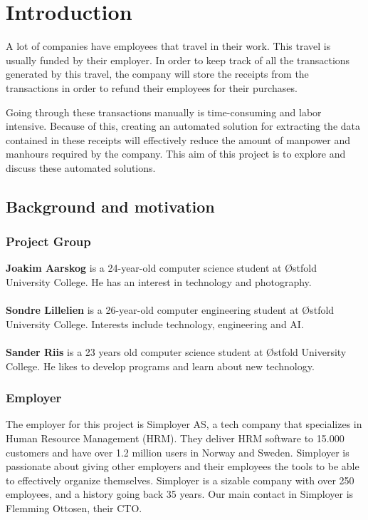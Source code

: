 \chapter{Introduction}
\label{ch:intro}
A lot of companies have employees that travel in their work.
This travel is usually funded by their employer.
In order to keep track of all the transactions generated by this travel, the company will store the receipts from the transactions in order to refund their employees for their purchases.

Going through these transactions manually is time-consuming and labor intensive.
Because of this, creating an automated solution for extracting the data contained in these receipts will effectively reduce the amount of manpower and manhours required by the company.
This aim of this project is to explore and discuss these automated solutions.

\section{Background and motivation}\label{sec:background-and-motivation}
\subsection{Project Group}\label{subsec:project-group}
\textbf{Joakim Aarskog} is a 24-year-old computer science student at Østfold University College.
He has an interest in technology and photography.\\
\\
\textbf{Sondre Lillelien} is a 26-year-old computer engineering student at Østfold University College.
Interests include technology, engineering and AI.\\
\\
\textbf{Sander Riis} is a 23 years old computer science student at Østfold University College.
He likes to develop programs and learn about new technology.

\subsection{Employer}\label{subsec:employer}
The employer for this project is Simployer AS, a tech company that specializes in Human Resource Management (HRM).
They deliver HRM software to 15.000 customers and have over 1.2 million users in Norway and Sweden.
Simployer is passionate about giving other employers and their employees the tools to be able to effectively organize themselves.
Simployer is a sizable company with over 250 employees, and a history going back 35 years.
Our main contact in Simployer is Flemming Ottosen, their CTO.

